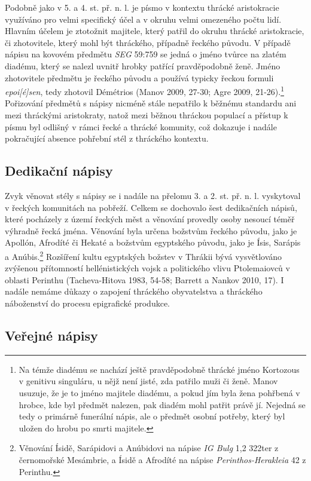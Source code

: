Podobně jako v 5. a 4. st. př. n. l. je písmo v kontextu thrácké aristokracie využíváno pro velmi specifický účel a v okruhu velmi omezeného počtu lidí. Hlavním účelem je ztotožnit majitele, který patřil do okruhu thrácké aristokracie, či zhotovitele, který mohl být thráckého, případně řeckého původu. V případě nápisu na kovovém předmětu {\em SEG} 59:759 se jedná o jméno tvůrce na zlatém diadému, který se nalezl uvnitř hrobky patřící pravděpodobně ženě. Jméno zhotovitele předmětu je řeckého původu a používá typicky řeckou formuli {\em epoi{[}é{]}sen}, tedy zhotovil Démétrios (Manov 2009, 27-30; Agre 2009, 21-26).\footnote{Na témže diadému se nachází ještě pravděpodobně thrácké jméno Kortozous v genitivu singuláru, u nějž není jisté, zda patřilo muži či ženě. Manov usuzuje, že je to jméno majitele diadému, a pokud jím byla žena pohřbená v hrobce, kde byl předmět nalezen, pak diadém mohl patřit právě jí. Nejedná se tedy o primárně funerální nápis, ale o předmět osobní potřeby, který byl uložen do hrobu po smrti majitele.} Pořizování předmětů s nápisy nicméně stále nepatřilo k běžnému standardu ani mezi thráckými aristokraty, natož mezi běžnou thráckou populací a přístup k písmu byl odlišný v rámci řecké a thrácké komunity, což dokazuje i nadále pokračující absence pohřební stél z thráckého kontextu.

\subsection[dedikační-nápisy-6]{Dedikační nápisy}

Zvyk věnovat stély s nápisy se i nadále na přelomu 3. a 2. st. př. n. l. vyskytoval v řeckých komunitách na pobřeží. Celkem se dochovalo šest dedikačních nápisů, které pocházely z území řeckých měst a věnování provedly osoby nesoucí téměř výhradně řecká jména. Věnování byla určena božstvům řeckého původu, jako je Apollón, Afrodíté či Hekaté a božstvům egyptského původu, jako je Ísis, Sarápis a Anúbis.\footnote{Věnování Ísidě, Sarápidovi a Anúbidovi na nápise {\em IG Bulg} 1,2 322ter z černomořské Mesámbrie, a Ísidě a Afrodíté na nápise {\em Perinthos-Herakleia} 42 z Perinthu.} Rozšíření kultu egyptských božstev v Thrákii bývá vysvětlováno zvýšenou přítomností hellénistických vojsk a politického vlivu Ptolemaiovců v oblasti Perinthu (Tacheva-Hitova 1983, 54-58; Barrett a Nankov 2010, 17). I nadále nemáme důkazy o zapojení thráckého obyvatelstva a thráckého náboženství do procesu epigrafické produkce.

\subsection[veřejné-nápisy-6]{Veřejné nápisy}

